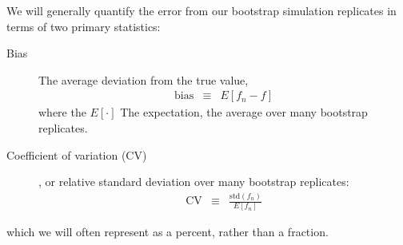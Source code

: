\documentclass[aps,pre,twocolumn,nofootinbib,superscriptaddress,linenumbers]{revtex4-1}
\begin{document}
We will generally quantify the error from our bootstrap simulation replicates in terms of two primary statistics:
\begin{description}
\item[Bias] The average deviation from the true value,
\begin{eqnarray}
\mathrm{bias} &\equiv& E[ f_n - f ]
\end{eqnarray}
where the $E[\cdot]$ The expectation, the average over many bootstrap replicates.
\item[Coefficient of variation (CV)], or relative standard deviation over many bootstrap replicates:
\begin{eqnarray}
\mathrm{CV} &\equiv& \frac{\mathrm{std}(f_n)}{E[f_n]}
\end{eqnarray}
\end{description}
which we will often represent as a percent, rather than a fraction.


%
\end{document}
